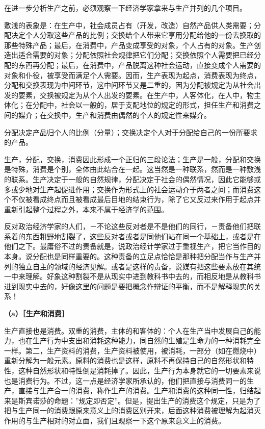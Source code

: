 \documentclass[a4paper,twoside,12pt]{ctexart}
\begin{document}
在进一步分析生产之前，必须观察一下经济学家拿来与生产并列的几个项目。

敷浅的表象是：在生产中，社会成员占有（开发，改造）自然产品供人类需要；分配决定个人分取这些产品的比例；交换给个人带来它享用分配给他的一份去换取的那些特殊产品；最后，在消费中，产品变成享受的对象，个人占有的对象。生产创造出适合需要的对象；分配依照社会规律把它们分配；交换依照个人需要把已经分配的东西再分配；最后，在消费中，产品脱离这种社会运动，直接变成个人需要的对象和仆役，被享受而满足个人需要。因而，生产表现为起点，消费表现为终点，分配和交换表现为中间环节，这中间环节又是二重的，因为分配被规定为从社会出发的要素，交换被规定为从个人出发的要素。在生产中，人客体化，在人中，物主体化；在分配中，社会以一般的，居于支配地位的规定的形式，担任生产和消费之间的媒介；在交换中，生产和消费由偶然的个人的规定性来媒介。

分配决定产品归个人的比例（分量）；交换决定个人对于分配给自己的一份所要求的产品。

生产，分配，交换，消费因此形成一个正归的三段论法；生产是一般，分配和交换是特殊，消费是个别，全体由此结合在一起。这当然是一种联系，然而是一种敷浅的联系。生产决定于一般的自然规律，分配决定于社会的偶然情况，因此它能够或多或少地对生产起促进作用；交换作为形式上的社会运动介于两者之间；而消费这个不仅被看成终点而且被看成最后目地的结束行为，除了它又反过来作用于起点并重新引起整个过程之外，本来不属于经济学的范围。

反对政治经济学家的人们，－不论这些反对者是不是他们的同行，－责备他们把联系着的东西粗野地割裂了，这些反对者或者是同他们站在同一个基础上，或者是在他们之下。最庸俗不过的责备就是，说政治经计学家过于重视生产，把它当作目的本身。说分配也是同样重要的。这种责备的立足点恰恰是那种把分配当作与生产并列的独立自主的领域的经济见解。或者是这样的责备，说媒有把这些要素放在其统一中来理解。好象这种割裂不是从现实中进到教科书中去的，而相反地是从教科书进到现实中去的，好像这里的问题是要把概念作辩证的平衡，而不是解释现实的关系！

\textbf{（a）［生产和消费］}

生产直接也是消费。双重的消费，主体的和客体的：个人在生产当中发展自己的能力，也在生产行为中支出和消耗这种能力，同自然的生殖是生命力的一种消耗完全一样。第二，生产资料的消费，生产资料被使用，被消耗，一部分（如在燃烧中）重新分解为一般元素。原料的消费也是这样，原料不再保持自己的自然形状和特性，这种自然形状和特性倒是消耗掉了。因此，生产行为本身就它的一切要素来说也是消费行为。不过，这一点是经济学家所承认的，他们把直接与消费同一的生产，直接与生产合一的消费，称作生产的消费。生产和消费的这种同一性，归结起来是斯宾诺莎的命题：”规定即否定”。但是，提出生产的消费这个规定，只是为了把与生产同一的消费跟原来意义上的消费区别开来，后面这种消费被理解为起消灭作用的与生产相对的对立面，我们且观察一下这个原来意义上的消费。
\end{document}

